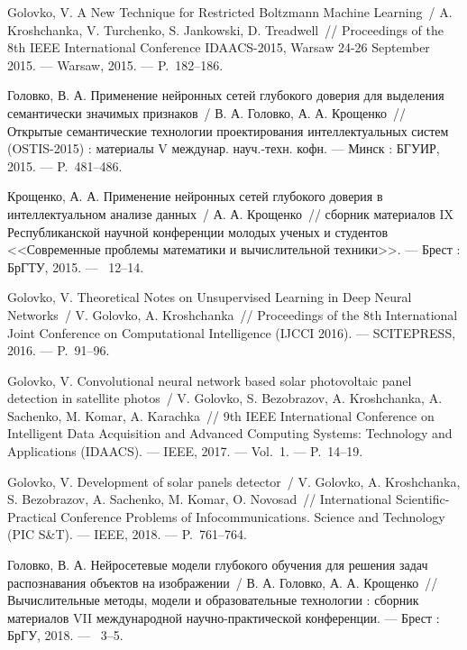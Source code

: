 Golovko, V. A New Technique for Restricted Boltzmann Machine Learning~/ A. Kroshchanka, V. Turchenko, S. Jankowski, D. Treadwell~//
  Proceedings of the 8th IEEE International Conference IDAACS-2015, Warsaw 24-26 September 2015. ---
\newblock Warsaw, 2015. ---
\newblock P.~182--186.

Головко, В. А. Применение нейронных сетей глубокого доверия для выделения семантически значимых признаков~/ В. А. Головко, А. А. Крощенко~// 
 Открытые семантические технологии проектирования интеллектуальных систем (OSTIS-2015) : материалы V междунар. науч.-техн. кофн. ---
\newblock Минск : БГУИР, 2015. ---
\newblock P.~481--486.

Крощенко, А. А. Применение нейронных сетей глубокого доверия в интеллектуальном анализе данных~/ А. А. Крощенко~// 
 сборник материалов IX Республиканской научной конференции молодых ученых и студентов <<Современные проблемы математики и вычислительной техники>>. ---
\newblock Брест : БрГТУ, 2015. ---
~12--14.

Golovko, V. Theoretical Notes on Unsupervised Learning in Deep Neural Networks~/ V. Golovko, A. Kroshchanka~//
  Proceedings of the 8th International Joint Conference on Computational Intelligence (IJCCI 2016). ---
\newblock SCITEPRESS, 2016. ---
\newblock P.~91--96.

Golovko, V. Convolutional neural network based solar photovoltaic panel detection in satellite photos~/ V. Golovko, S. Bezobrazov, A. Kroshchanka, A. Sachenko, M. Komar, A. Karachka~//
  9th IEEE International Conference on Intelligent Data Acquisition and Advanced Computing Systems: Technology and Applications (IDAACS). ---
\newblock IEEE, 2017. ---
\newblock Vol.~1. ---
\newblock P.~14--19.

Golovko, V. Development of solar panels detector~/ V. Golovko, A. Kroshchanka, S. Bezobrazov, A. Sachenko, M. Komar, O. Novosad~//
  International Scientific-Practical Conference Problems of Infocommunications. Science and Technology (PIC S\&T). ---
\newblock IEEE, 2018. ---
\newblock P.~761--764.

Головко, В. А. Нейросетевые модели глубокого обучения для решения задач распознавания объектов на изображении~/ В. А. Головко, А. А. Крощенко~//
 Вычислительные методы, модели и образовательные технологии : сборник материалов VII международной научно-практической конференции. ---
\newblock Брест : БрГУ, 2018. ---
~3--5. 


